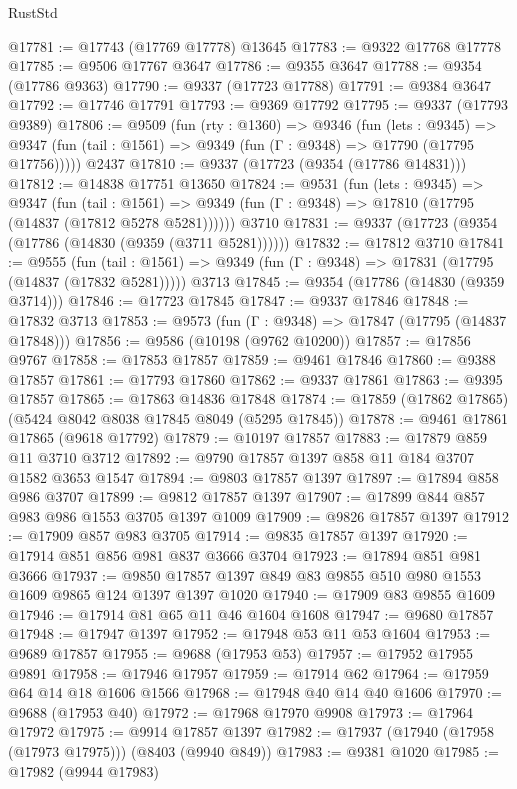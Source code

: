 \begin{lexlean}{RustStd}
\begin{coremodule}
@17781 := @17743 (@17769 @17778) @13645
@17783 := @9322 @17768 @17778
@17785 := @9506 @17767 @3647
@17786 := @9355 @3647
@17788 := @9354 (@17786 @9363)
@17790 := @9337 (@17723 @17788)
@17791 := @9384 @3647
@17792 := @17746 @17791
@17793 := @9369 @17792
@17795 := @9337 (@17793 @9389)
@17806 := @9509
    (fun (rty : @1360) =>
    @9346
      (fun (lets : @9345) =>
      @9347 (fun (tail : @1561) => @9349 (fun (Γ : @9348) => @17790 (@17795 @17756)))))
    @2437
@17810 := @9337 (@17723 (@9354 (@17786 @14831)))
@17812 := @14838 @17751 @13650
@17824 := @9531
    (fun (lets : @9345) =>
    @9347
      (fun (tail : @1561) =>
      @9349 (fun (Γ : @9348) => @17810 (@17795 (@14837 (@17812 @5278 @5281))))))
    @3710
@17831 := @9337 (@17723 (@9354 (@17786 (@14830 (@9359 (@3711 @5281))))))
@17832 := @17812 @3710
@17841 := @9555
    (fun (tail : @1561) => @9349 (fun (Γ : @9348) => @17831 (@17795 (@14837 (@17832 @5281)))))
    @3713
@17845 := @9354 (@17786 (@14830 (@9359 @3714)))
@17846 := @17723 @17845
@17847 := @9337 @17846
@17848 := @17832 @3713
@17853 := @9573 (fun (Γ : @9348) => @17847 (@17795 (@14837 @17848)))
@17856 := @9586 (@10198 (@9762 @10200))
@17857 := @17856 @9767
@17858 := @17853 @17857
@17859 := @9461 @17846
@17860 := @9388 @17857
@17861 := @17793 @17860
@17862 := @9337 @17861
@17863 := @9395 @17857
@17865 := @17863 @14836 @17848
@17874 := @17859 (@17862 @17865) (@5424 @8042 @8038 @17845 @8049 (@5295 @17845))
@17878 := @9461 @17861 @17865 (@9618 @17792)
@17879 := @10197 @17857
@17883 := @17879 @859 @11 @3710 @3712
@17892 := @9790 @17857 @1397 @858 @11 @184 @3707 @1582 @3653 @1547
@17894 := @9803 @17857 @1397
@17897 := @17894 @858 @986 @3707
@17899 := @9812 @17857 @1397
@17907 := @17899 @844 @857 @983 @986 @1553 @3705 @1397 @1009
@17909 := @9826 @17857 @1397
@17912 := @17909 @857 @983 @3705
@17914 := @9835 @17857 @1397
@17920 := @17914 @851 @856 @981 @837 @3666 @3704
@17923 := @17894 @851 @981 @3666
@17937 := @9850 @17857 @1397 @849 @83 @9855 @510 @980 @1553 @1609 @9865 @124 @1397 @1397 @1020
@17940 := @17909 @83 @9855 @1609
@17946 := @17914 @81 @65 @11 @46 @1604 @1608
@17947 := @9680 @17857
@17948 := @17947 @1397
@17952 := @17948 @53 @11 @53 @1604
@17953 := @9689 @17857
@17955 := @9688 (@17953 @53)
@17957 := @17952 @17955 @9891
@17958 := @17946 @17957
@17959 := @17914 @62
@17964 := @17959 @64 @14 @18 @1606 @1566
@17968 := @17948 @40 @14 @40 @1606
@17970 := @9688 (@17953 @40)
@17972 := @17968 @17970 @9908
@17973 := @17964 @17972
@17975 := @9914 @17857 @1397
@17982 := @17937 (@17940 (@17958 (@17973 @17975))) (@8403 (@9940 @849))
@17983 := @9381 @1020
@17985 := @17982 (@9944 @17983)

\end{coremodule}
\end{lexlean}
